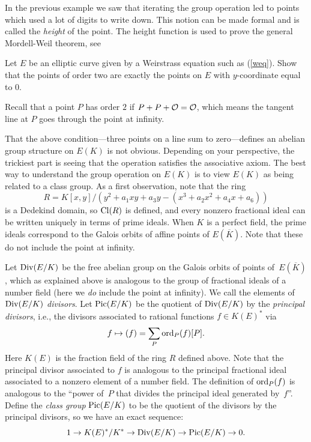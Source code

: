 \begin{remark}
In the previous example we saw that iterating the
group operation led to points which used a lot of digits
to write down. This notion can be made formal and is called
the \emph{height} of the point. The height function is used
to prove the general Mordell-Weil theorem, see
\cite[Ch.~VIII.4]{silverman:aec}
\end{remark}

\begin{exercise}\label{ex:ec2torsion}
	Let $E$ be an elliptic curve given by a
	Weirstrass equation such as (\ref{weq}).
	Show that the points of order two are exactly
	the points on $E$ with $y$-coordinate equal to
	$0$.

	\begin{hint}
		Recall that a point $P$ has order $2$ if
		$P + P + \mathcal{O} = \mathcal{O}$, which means the tangent line
		at $P$ goes through the point at infinity.
	\end{hint}
\end{exercise}

That the above condition---three points on a line sum to
zero---defines an abelian group structure on $E(K)$ is not obvious.
Depending on your perspective, the trickiest part is seeing that the
operation satisfies the associative axiom.  The best way to understand
the group operation on $E(K)$ is to view $E(K)$ as being related to a
class group.  As a first observation, note that the ring
$$
 R = K[x,y]/(y^2 +a_1 xy + a_3 y - (x^3 + a_2 x^2 + a_4 x + a_6))
$$
is a Dedekind domain, so $\operatorname{Cl}(R)$ is defined, and every nonzero
fractional ideal can be written uniquely in terms of prime ideals.
When $K$ is a perfect field, the prime ideals correspond to the Galois
orbits of affine points of $E(\overline{K})$.
Note that these do not include the point at infinity.

Let $\operatorname{Div}(E/K)$ be the free abelian group on the Galois orbits of
points of~$E(\overline{K})$, which as explained above is analogous to
the group of fractional ideals of a number field (here we {\em do}
include the point at infinity).
We call the elements of $\operatorname{Div}(E/K)$
{\em divisors}.  Let $\operatorname{Pic}(E/K)$ be the quotient of $\operatorname{Div}(E/K)$ by the
\emph{principal divisors}, i.e., the divisors associated to rational functions
$f\in K(E)^*$ via
$$
 f \mapsto (f) = \sum_{P} \operatorname{ord}_P(f) [P].
$$
Here $K(E)$ is the fraction field of the ring $R$ defined above.
Note that the principal divisor associated to $f$ is analogous to the
principal fractional ideal associated to a nonzero element of a number
field.  The definition of $\operatorname{ord}_P(f)$ is analogous to the ``power
of~$P$ that divides the principal ideal generated by~$f$''.
Define the \emph{class group} $\operatorname{Pic}(E/K)$ to be the quotient of the
divisors by the principal divisors, so we have
an exact sequence:
$$
  1\to K(E)^*/K^* \to \operatorname{Div}(E/K) \to \operatorname{Pic}(E/K) \to 0.
$$

